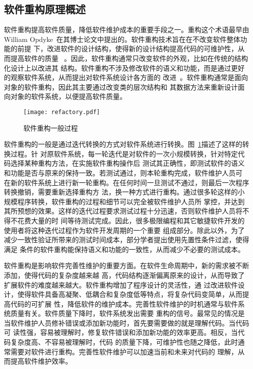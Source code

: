 \subsection{软件重构原理概述}

软件重构提高软件质量，降低软件维护成本的重要手段之一。重构这个术语最早由William
Opdyke~\cite{opdyke1992refactoring}在其博士论文中提出的。软件重构技术旨在在不改变软件整体功能的前提
下，改进软件的设计结构，使得新的设计结构提高代码的可维护性，从而提高软件的质量
~\cite{fowler1999refactoring}。因此，软件重构通常只改变软件的外观，比如在传统的结构化设计上以改进其
结构。软件重构不涉及修改软件的语义和功能，而是通过更好的观察软件系统，从而提出对软件系统设计各方面的
改进~\cite{chikofsky1990reverse}。软件重构通常是面向对象的软件重构，因此其主要通过改变类的层次结构和
其数据方法来重新设计面向对象的软件系统，以便提高软件质量。

\begin{figure}
  \centering
  \texttt{[image: refactory.pdf]}  
  \caption{\label{fig:refactory}软件重构一般过程}
\end{figure}

软件重构的一般是通过迭代转换的方式对软件系统进行转换。图~\ref{fig:refactory}描述了这样的转换过程。针
对原软件系统，每一轮迭代是对软件的一次小规模转换，针对特定代码选择某种重构方法，在实施软件重构操作后
测试其正确性，即测试软件的语义和功能是否与原来的保持一致。若测试通过，则本轮重构完成，软件维护人员可
在新的软件系统上进行新一轮重构。在任何时间一旦测试不通过，则最后一次程序转换撤销，需要重新选择重构方
法，换一种方式进行重构。通过很多轮这样的小规模程序转换，软件重构的过程和细节可以完全被软件维护人员所
掌控，并达到其所预想的效果。这样的迭代过程要求测试过程十分迅速，否则软件维护人员将不得不花费大量的时
间等待测试完成。因此，很多极限编程和其它敏捷软件开发的使用者将这种迭代过程作为软件开发周期的一个重要
组成部分。除此以外，为了减少一致性验证所带来的测试时间成本，部分学者提出使用先置性条件过滤，使得满足
条件的软件重构能保持语义和功能的一致性，从而减少不必要的测试成本。

软件重构是影响软件完善性维护的重要方面。在软件生命周期中，新的需求被不断添加，使得代码的复杂度越来越
高，代码结构逐渐偏离原来的设计，从而导致了扩展软件的难度越来越大。软件重构增加了程序设计的灵活性，通
过改进软件设计，使得软件具备高凝聚、低耦合和复杂度低等特点，将复杂代码变简单，从而提高代码的可扩展
性，降低软件的维护成本。完善性软件维护的时机通常与软件系统质量有关。软件质量下降时，软件系统发出需要
重构的信号。最常见的情况是当软件维护人员修补错误或添加新功能时，首先要需要做的就是理解代码。当代码可
读性强，容易被理解时，修复软件错误和添加新功能的效率更高。相反，当代码复杂度高、不容易被理解时，代码
的质量下降，可维护性也随之降低，此时通常需要对软件进行重构。完善性软件维护可以加速当前和未来对代码的
理解，从而提高软件维护效率。

